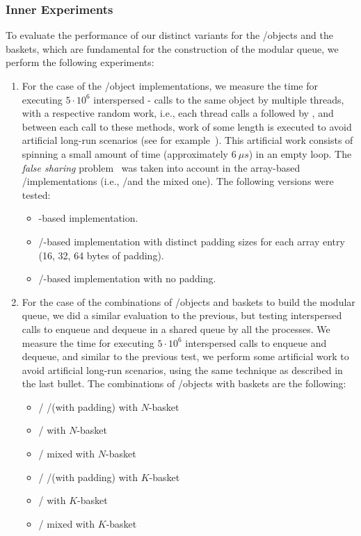 \subsubsection{\label{subsubsec:queue-experiments-inner-experiments}Inner Experiments}

To evaluate the performance of our distinct variants for the \LL/\IC objects and the baskets, which are fundamental for the construction of the modular queue, we perform the following experiments:

\begin{enumerate}
    \item For the case of the \LL/\IC object implementations, we measure the time for executing \(5 \cdot 10^6\) interspersed \LL - \IC calls to the same object by multiple threads, with a respective random work, i.e., each thread calls a \LL followed by \IC, and between each call to these methods, work of some length is executed to avoid artificial long-run scenarios (see for example~\cite{DBLP_conf_ppopp_YangM16}). This artificial work consists of spinning a small amount of time (approximately \(6\ \mu{}s\)) in an empty loop. The \emph{false sharing} problem~\cite{BoloskyMichael93} was taken into account in the array-based \LL/\IC implementations (i.e., \R/\W and the mixed one). The following versions were tested:

    \begin{itemize}
        \item \CAS-based implementation.
        \item \R/\W-based implementation with distinct padding sizes for each array entry (16, 32, 64 bytes of padding).
        \item \R/\W-based implementation with no padding.
    \end{itemize}

    \item For the case of the combinations of \LL/\IC objects and baskets to build the modular queue, we did a similar evaluation to the previous, but testing interspersed calls to enqueue and dequeue in a shared queue by all the processes. We measure the time for executing \(5\cdot 10^6\) interspersed calls to enqueue and dequeue, and similar to the previous test, we perform some artificial work to avoid artificial long-run scenarios, using the same technique as described in the last bullet. The combinations of \LL/\IC objects with baskets are the following:
    \begin{itemize}
        \item \LL/\IC{} \R/\W (with padding) with \(N\)-basket
        \item \LL/\IC{} \CAS with \(N\)-basket
        \item \LL/\IC{} mixed with \(N\)-basket
        \item \LL/\IC{} \R/\W (with padding) with \(K\)-basket
        \item \LL/\IC{} \CAS with \(K\)-basket
        \item \LL/\IC{} mixed with \(K\)-basket
    \end{itemize}
\end{enumerate}



